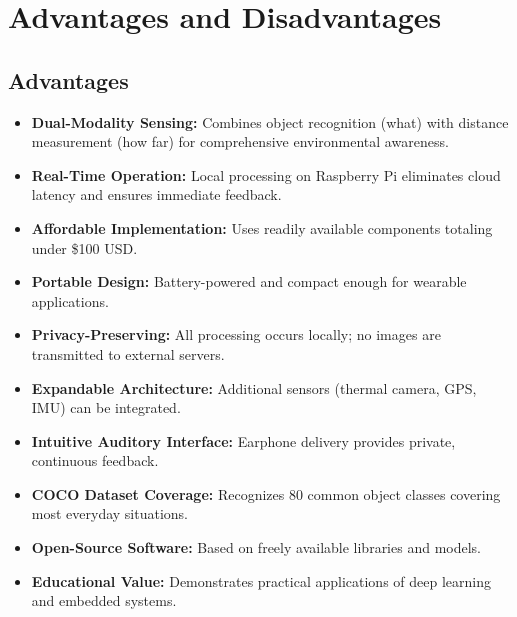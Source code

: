 \documentclass[conference]{IEEEtran}
\begin{document}
\section{Advantages and Disadvantages}
\subsection{Advantages}
\begin{itemize}
    \item \textbf{Dual-Modality Sensing:} Combines object recognition (what) with distance measurement (how far) for comprehensive environmental awareness.
    \item \textbf{Real-Time Operation:} Local processing on Raspberry Pi eliminates cloud latency and ensures immediate feedback.
    \item \textbf{Affordable Implementation:} Uses readily available components totaling under \$100 USD.
    \item \textbf{Portable Design:} Battery-powered and compact enough for wearable applications.
    \item \textbf{Privacy-Preserving:} All processing occurs locally; no images are transmitted to external servers.
    \item \textbf{Expandable Architecture:} Additional sensors (thermal camera, GPS, IMU) can be integrated.
    \item \textbf{Intuitive Auditory Interface:} Earphone delivery provides private, continuous feedback.
    \item \textbf{COCO Dataset Coverage:} Recognizes 80 common object classes covering most everyday situations.
    \item \textbf{Open-Source Software:} Based on freely available libraries and models.
    \item \textbf{Educational Value:} Demonstrates practical applications of deep learning and embedded systems.
\end{itemize}
\end{document}
